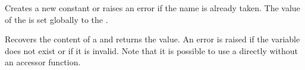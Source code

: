 \documentclass[oneside]{book}
\begin{document}
\begin{function}{\TlConst}
\begin{syntax}
  
\end{syntax}
Creates a new constant  or raises an error
if the name is already taken. The value of the
 is set globally to the .
\begin{codehigh}
\TlConst {}
\end{codehigh}
\end{function}

\begin{function}{\TlUse}
\begin{syntax}
 
\end{syntax}
Recovers the content of a  and returns the value.
An error is raised if the variable
does not exist or if it is invalid. Note that it is possible to use
a  directly without an accessor function.
\begin{codehigh}
\TlUse \lTmpbTl
\end{codehigh}
\end{function}
\end{document}
